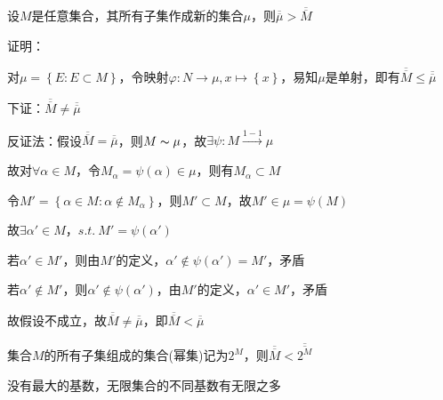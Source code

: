 \begin{td}
    设$M$是任意集合，其所有子集作成新的集合$\mu $，则$\overline{\overline{\mu }} > \overline{\overline{M}} $
\end{td}
\noindent 证明：
\par 对$\mu = \left\{E : E \subset M\right\} $，令映射$\varphi : N \to \mu  ,x \mapsto \left\{x\right\} $，易知$\mu$是单射，即有$\overline{\overline{M}} \leqslant \overline{\overline{\mu }}$
\par 下证：$\overline{\overline{M}} \neq \overline{\overline{\mu }}$
\par 反证法：假设$\overline{\overline{M}} = \overline{\overline{\mu }}$，则$M \thicksim \mu$，故$\exists \psi : M \stackrel{1-1}{\to} \mu$
\par \quad \quad \quad \quad 故对$\forall \alpha \in M$，令$M_{\alpha } = \psi (\alpha ) \in \mu$，则有$M_{\alpha } \subset M$
\par \quad \quad \quad \quad 令$M' = \left\{\alpha \in M : \alpha \notin M_{\alpha }\right\} $，则$M' \subset M$，故$M' \in \mu = \psi (M)$
\par \quad \quad \quad \quad 故$\exists \alpha ' \in M$，$s.t. \ M' = \psi (\alpha ')$
\par \quad \quad \quad \quad {} 若$\alpha ' \in M'$，则由$M'$的定义，$\alpha ' \notin \psi (\alpha ') = M'$，矛盾
\par \quad \quad \quad \quad {} 若$\alpha ' \notin M'$，则$\alpha ' \notin \psi (\alpha ')$，由$M'$的定义，$\alpha ' \in M'$，矛盾
\par \quad \quad \quad \quad 故假设不成立，故$\overline{\overline{M}} \neq \overline{\overline{\mu }}$，即$\overline{\overline{M}} < \overline{\overline{\mu }}$

\begin{wa}
    集合$M$的所有子集组成的集合(幂集)记为$2^{M}$，则$\overline{\overline{M}} <\overline{\overline{2^{M}}} $
    \par 没有最大的基数，无限集合的不同基数有无限之多
\end{wa}

